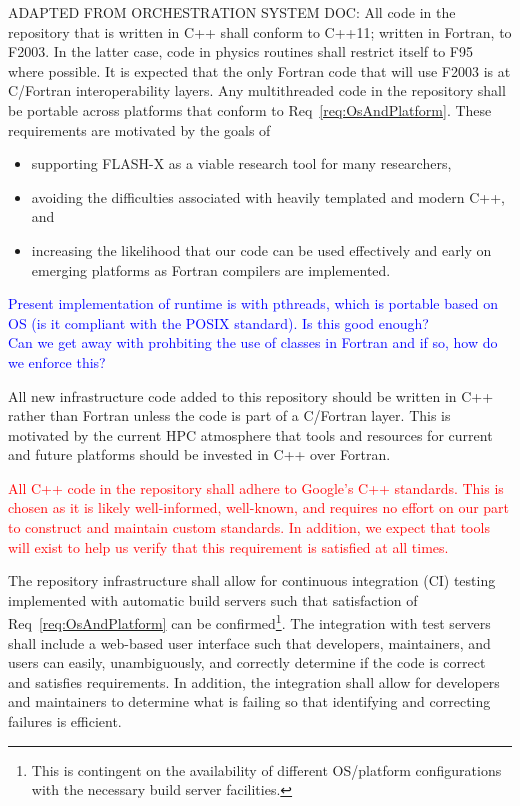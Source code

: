 \documentclass{article}
\newcommand{\FutureFlash}       {\textsf{FLASH}-X\xspace}
\begin{document}
\begin{req}
\label{req:LanguageStandards}
ADAPTED FROM ORCHESTRATION SYSTEM DOC: All code in the repository that is
written in C++ shall conform to C++11; written in Fortran, to F2003.  In the
latter case, code in physics routines shall restrict itself to F95 where
possible.  It is expected that the only Fortran code that will use F2003 is at
C/Fortran interoperability layers.  Any multithreaded code  in the repository
shall be portable across platforms that conform to Req~\ref{req:OsAndPlatform}.
These requirements are motivated by the goals of
\begin{itemize}
\item{supporting \FutureFlash as a viable research tool for many researchers,}
\item{avoiding the difficulties associated with heavily templated and modern
C++, and}
\item{increasing the likelihood that our code can be used effectively and early
on emerging platforms as Fortran compilers are implemented.}
\end{itemize}
\end{req}
\textcolor{blue}{Present implementation of runtime is with pthreads, which is
portable based on OS (is it compliant with the POSIX standard).  Is this good
enough?}\\
\textcolor{blue}{Can we get away with prohbiting the use of classes in Fortran
and if so, how do we enforce this?}

\begin{req}
\label{req:PreferC++}
All new infrastructure code added to this repository should be written in C++
rather than Fortran unless the code is part of a C/Fortran layer.  This is
motivated by the current HPC atmosphere that tools and resources for current and
future platforms should be invested in C++ over Fortran.
\end{req}

\textcolor{red}{
\begin{req}
\label{req:C++Standards}
All C++ code in the repository shall adhere to Google's C++ standards.  This is
chosen as it is likely well-informed, well-known, and requires no effort on our
part to construct and maintain custom standards.  In addition, we expect that
tools will exist to help us verify that this requirement is satisfied at all
times.
\end{req}}

\begin{req}
The repository infrastructure shall allow for continuous integration (CI)
testing implemented with automatic build servers such that satisfaction of
Req~\ref{req:OsAndPlatform} can be confirmed\footnote{This is contingent on the
availability of different OS/platform configurations with the necessary build
server facilities.}.  The integration with test servers shall include a
web-based user interface such that developers, maintainers, and users can
easily, unambiguously, and correctly determine if the code is correct and
satisfies requirements.  In addition, the integration shall allow for developers
and maintainers to determine what is failing so that identifying and correcting
failures is efficient.
\end{req}
\end{document}
